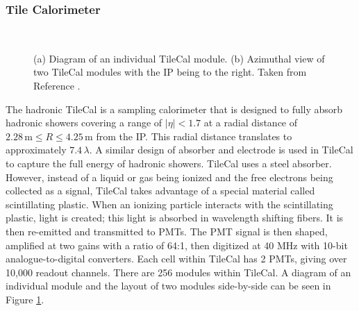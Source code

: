 		\subsubsection{Tile Calorimeter}\label{sssec:Tile}
			\begin{figure}[!ht]
			\centering
			 \\
			\caption{\label{fig:tile-modules} (a) Diagram of an individual \gls{TileCal} module. (b) Azimuthal view of two \gls{TileCal} modules with the \gls{IP} being to the right. Taken from Reference \cite{ATLAS-tile}.}
			\end{figure}
			The hadronic \gls{TileCal} is a sampling calorimeter that is designed to fully absorb hadronic showers covering a range of $|\eta|<1.7$ at a radial distance of $2.28 \, \mathrm{m} \leq R \leq 4.25 \, \mathrm{m}$ from the \gls{IP}. This radial distance translates to approximately $7.4\, \lambda$. A similar design of absorber and electrode is used in \gls{TileCal} to capture the full energy of hadronic showers. \gls{TileCal} uses a steel absorber. However, instead of a liquid or gas being ionized and the free electrons being collected as a signal, \gls{TileCal} takes advantage of a special material called scintillating plastic. When an ionizing particle interacts with the scintillating plastic, light is created; this light is absorbed in wavelength shifting fibers. It is then re-emitted and transmitted to \glspl{PMT}. The \gls{PMT} signal is then shaped, amplified at two gains with a ratio of 64:1, then digitized at 40 MHz with 10-bit analogue-to-digital converters. Each cell within \gls{TileCal} has 2 \glspl{PMT}, giving over 10,000 readout channels. There are 256 modules within \gls{TileCal}. A diagram of an individual module and the layout of two modules side-by-side can be seen in Figure \ref{fig:tile-modules}.
			

